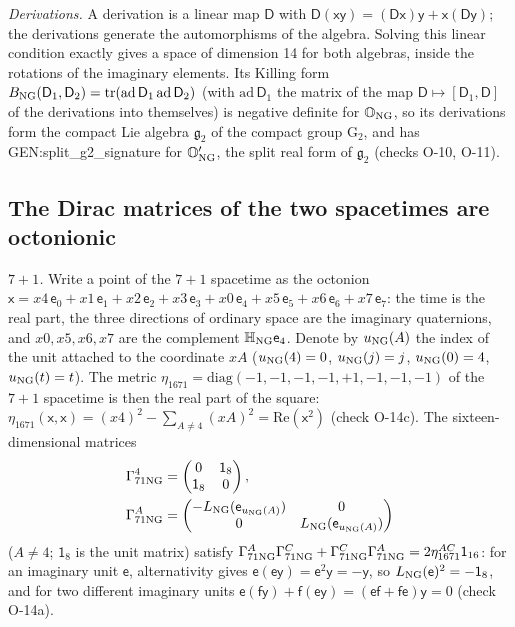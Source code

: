 \emph{Derivations.} A derivation is a linear map $\mathsf D$ with $\mathsf D(\mathsf x\mathsf y)=(\mathsf D\mathsf x)
\mathsf y+\mathsf x(\mathsf D\mathsf y)$; the derivations generate the automorphisms of the algebra. Solving this
linear condition exactly gives a space of dimension 14 for both algebras, inside the rotations of
the imaginary elements. Its Killing form $B_{\rm NG}(\mathsf D_1,\mathsf D_2)=\mathrm{tr}(\mathrm{ad}\,\mathsf D_1\,
\mathrm{ad}\,\mathsf D_2)$ (with $\mathrm{ad}\,\mathsf D_1$ the matrix of the map $\mathsf D\mapsto[\mathsf D_1,\mathsf D]$ of the derivations into themselves) is negative
definite for $\mathbb O_{\rm NG}$, so its derivations form the compact Lie algebra $\mathfrak g_2$ of the
compact group $\mathrm G_2$, and has {{GEN:split_g2_signature}} for $\mathbb O'_{\rm NG}$, the split real
form of $\mathfrak g_2$ (checks O-10, O-11).

\subsection{The Dirac matrices of the two spacetimes are octonionic}

\emph{$7+1$.} Write a point of the $7+1$ spacetime as the octonion
$\mathsf x=x4\,\mathsf e_0+x1\,\mathsf e_1+x2\,\mathsf e_2+x3\,\mathsf e_3+x0\,\mathsf e_4+x5\,\mathsf e_5+x6\,\mathsf e_6+x7\,\mathsf e_7$:
the time is the real part, the three directions of ordinary space are the imaginary quaternions, and
$x0,x5,x6,x7$ are the complement $\mathbb H_{\rm NG}\mathsf e_4$. Denote by $u_{\rm NG}(A)$ the index of the
unit attached to the coordinate $xA$ ($u_{\rm NG}(4)=0$, $u_{\rm NG}(j)=j$, $u_{\rm NG}(0)=4$,
$u_{\rm NG}(t)=t$). The metric $\eta_{1671}=\mathrm{diag}(-1,-1,-1,-1,+1,-1,-1,-1)$ of the $7+1$ spacetime is
then the real part of the square: $\eta_{1671}(\mathsf x,\mathsf x)=(x4)^2-\sum_{A\ne4}(xA)^2=\mathrm{Re}(\mathsf x^2)$
(check O-14c). The sixteen-dimensional matrices
\begin{align}
\Gamma^4_{71\rm NG}&=\begin{pmatrix}0&\mathsf 1_8\\ \mathsf 1_8&0\end{pmatrix},\nonumber\\
\Gamma^A_{71\rm NG}&=\begin{pmatrix}-L_{\rm NG}(\mathsf e_{u_{\rm NG}(A)})&0\\0&L_{\rm NG}(\mathsf e_{u_{\rm NG}(A)})\end{pmatrix}
\label{eq:gamma71oct}
\end{align}
($A\neq4$; $\mathsf 1_8$ is the unit matrix) satisfy $\Gamma^A_{71\rm NG}\Gamma^C_{71\rm NG}+
\Gamma^C_{71\rm NG}\Gamma^A_{71\rm NG}=2\eta_{1671}^{AC}\mathsf 1_{16}$: for an imaginary unit $\mathsf e$,
alternativity gives $\mathsf e(\mathsf e\mathsf y)=\mathsf e^2\mathsf y=-\mathsf y$, so $L_{\rm NG}(\mathsf e)^2=-\mathsf 1_8$, and
for two different imaginary units $\mathsf e(\mathsf f\mathsf y)+\mathsf f(\mathsf e\mathsf y)=(\mathsf e\mathsf f+\mathsf f\mathsf e)\mathsf y=0$
(check O-14a).

